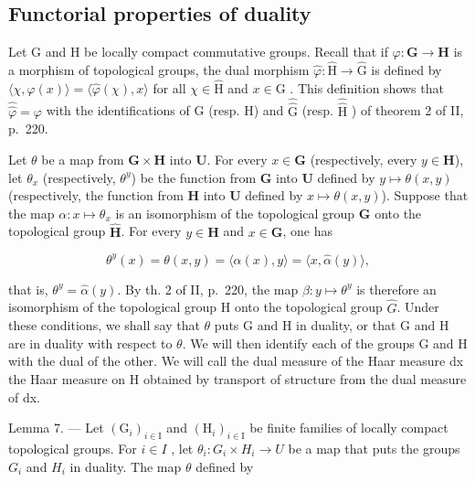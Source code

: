\subsection{Functorial properties of duality}

Let G and H be locally compact commutative groups. Recall that if \(\varphi\colon\mathbf{G}\to\mathbf{H}\) is a morphism of topological groups, the dual morphism \(\widehat{\varphi}\colon\widehat{\mathrm{H}}\to\widehat{\mathrm{G}}\) is defined by \(\langle\chi,\varphi(x)\rangle=\langle\widehat{\varphi}(\chi),x\rangle\) for all \(\chi\in\widehat{\mathrm{H}}\) and \(x\in\mathrm{G}\) . This definition shows that \(\widehat{\widehat{\varphi}}=\varphi\) with the identifications of G (resp. H) and \(\widehat{\widehat{\mathrm{G}}}\) (resp. \(\widehat{\widehat{\mathrm{H}}}\) ) of theorem 2 of II, p.~220.

Let \(\theta\) be a map from \(\mathbf{G} \times \mathbf{H}\) into \(\mathbf{U}\). For every \(x \in \mathbf{G}\) (respectively, every \(y \in \mathbf{H}\)), let \(\theta_x\) (respectively, \(\theta^y\)) be the function from \(\mathbf{G}\) into \(\mathbf{U}\) defined by \(y \mapsto \theta(x, y)\) (respectively, the function from \(\mathbf{H}\) into \(\mathbf{U}\) defined by \(x \mapsto \theta(x, y)\)). Suppose that the map \(\alpha: x \mapsto \theta_x\) is an isomorphism of the topological group \(\mathbf{G}\) onto the topological group \(\widehat{\mathbf{H}}\). For every \(y \in \mathbf{H}\) and \(x \in \mathbf{G}\), one has

\[
\theta^ {y} (x) = \theta (x, y) = \langle \alpha (x), y \rangle = \langle x, \widehat {\alpha} (y) \rangle ,
\]

that is, \(\theta^{y} = \widehat{\alpha}(y)\). By th. 2 of II, p.~220, the map \(\beta: y \mapsto \theta^{y}\) is therefore an isomorphism of the topological group H onto the topological group \(\widehat{G}\). Under these conditions, we shall say that \(\theta\) puts G and H in duality, or that G and H are in duality with respect to \(\theta\). We will then identify each of the groups G and H with the dual of the other. We will call the dual measure of the Haar measure dx the Haar measure on H obtained by transport of structure from the dual measure of dx.

Lemma 7. --- Let \((\mathrm{G}_{i})_{i\in\mathrm{I}}\) and \((\mathrm{H}_{i})_{i\in\mathrm{I}}\) be finite families of locally compact topological groups. For \(i\in I\) , let \(\theta_{i}\colon G_{i}\times H_{i}\to U\) be a map that puts the groups \(G_{i}\) and \(H_{i}\) in duality. The map \(\theta\) defined by

